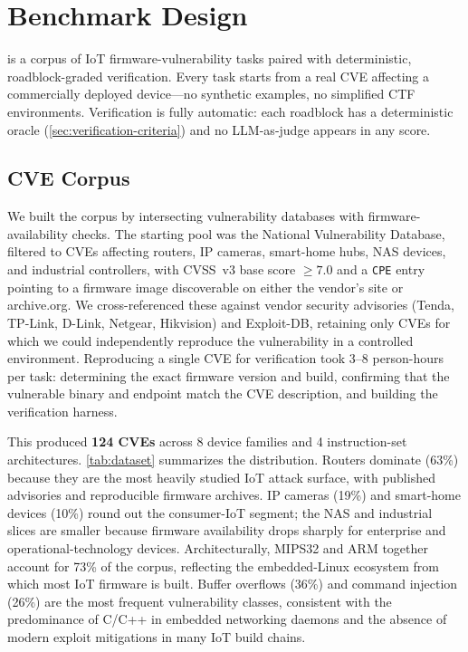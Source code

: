 \section{Benchmark Design}
\label{sec:benchmark}

\sys is a corpus of IoT firmware-vulnerability tasks paired with deterministic, roadblock-graded verification. Every task starts from a real CVE affecting a commercially deployed device---no synthetic examples, no simplified CTF environments. Verification is fully automatic: each roadblock has a deterministic oracle (\cref{sec:verification-criteria}) and no LLM-as-judge appears in any score.

\subsection{CVE Corpus}

We built the corpus by intersecting vulnerability databases with firmware-availability checks. The starting pool was the National Vulnerability Database, filtered to CVEs affecting routers, IP cameras, smart-home hubs, NAS devices, and industrial controllers, with CVSS~v3 base score $\ge 7.0$ and a \texttt{CPE} entry pointing to a firmware image discoverable on either the vendor's site or archive.org. We cross-referenced these against vendor security advisories (Tenda, TP-Link, D-Link, Netgear, Hikvision) and Exploit-DB, retaining only CVEs for which we could independently reproduce the vulnerability in a controlled environment. Reproducing a single CVE for verification took 3--8 person-hours per task: determining the exact firmware version and build, confirming that the vulnerable binary and endpoint match the CVE description, and building the verification harness.

This produced \textbf{124 CVEs} across 8 device families and 4 instruction-set architectures. \cref{tab:dataset} summarizes the distribution. Routers dominate (63\%) because they are the most heavily studied IoT attack surface, with published advisories and reproducible firmware archives. IP cameras (19\%) and smart-home devices (10\%) round out the consumer-IoT segment; the NAS and industrial slices are smaller because firmware availability drops sharply for enterprise and operational-technology devices. Architecturally, MIPS32 and ARM together account for 73\% of the corpus, reflecting the embedded-Linux ecosystem from which most IoT firmware is built. Buffer overflows (36\%) and command injection (26\%) are the most frequent vulnerability classes, consistent with the predominance of C/C++ in embedded networking daemons and the absence of modern exploit mitigations in many IoT build chains.

